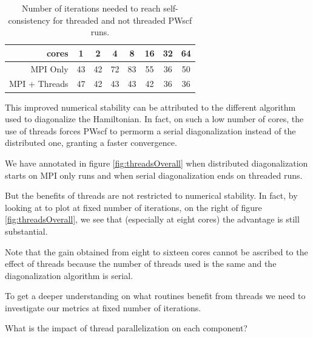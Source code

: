 \documentclass[a4paper,12pt]{article}
\begin{document}
\begin{table}[hhh!]
\begin{center}
\begin{tabular}{r|ccccccc}
\toprule
cores 	 &  1  &  2  &  4  &  8  &  16  &  32  &  64 \\
\midrule
MPI Only & 43  & 42  & 72  & 83  &  55  &  36  &  50 \\ 
MPI + Threads &  47  &  42  &  43  &  43  &  42  &  36  &  36 \\ 
\bottomrule
\end{tabular}
\end{center}
\caption{Number of iterations needed to reach self-consistency for threaded and not threaded PWscf runs.}
\label{tab:threadsIterations}
\end{table}



This improved numerical stability can be attributed to the different algorithm used to diagonalize the Hamiltonian. 
In fact, on such a low number of cores, the use of threads forces PWscf to permorm a serial diagonalization instead of the distributed one, granting a faster convergence.

We have annotated in figure \ref{fig:threadsOverall} when distributed diagonalization starts on MPI only runs and when serial diagonalization ends on threaded runs.

But the benefits of threads are not restricted to numerical stability.
In fact, by looking at to plot at fixed number of iterations, on the right of figure \ref{fig:threadsOverall}, we see that (especially at eight cores) the advantage is still substantial.

Note that the gain obtained from eight to sixteen cores cannot be ascribed to the effect of threads because the number of threads used is the same and the diagonalization algorithm is serial.

To get a deeper understanding on what routines benefit from threads we need to investigate our metrics at fixed number of iterations.


\newpage

\begin{center}
\begin{framed}
What is the impact of thread parallelization on each component?
\end{framed}
\end{center}
\end{document}
